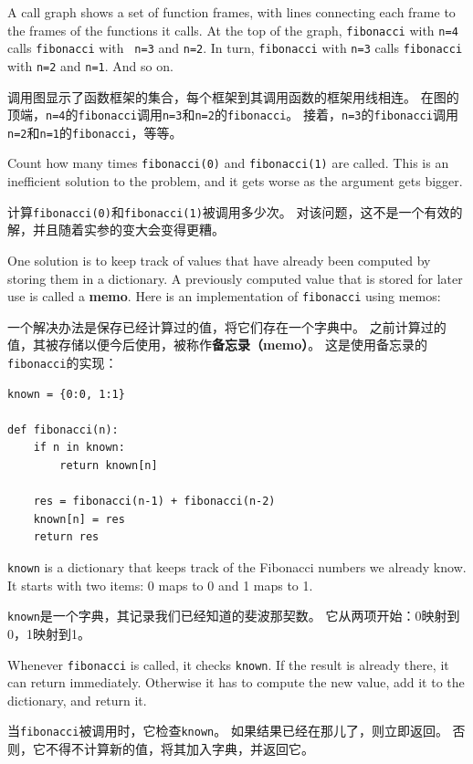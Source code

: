 \documentclass[10pt]{book}
\begin{document}
\begin{CJK}{UTF8}{gbsn}
A call graph shows a set of function frames, with lines connecting each
frame to the frames of the functions it calls.  At the top of the
graph, {\tt fibonacci} with {\tt n=4} calls {\tt fibonacci} with {\tt
n=3} and {\tt n=2}.  In turn, {\tt fibonacci} with {\tt n=3} calls
{\tt fibonacci} with {\tt n=2} and {\tt n=1}.  And so on.

调用图显示了函数框架的集合，每个框架到其调用函数的框架用线相连。
在图的顶端，{\tt n=4}的{\tt fibonacci}调用{\tt n=3}和{\tt n=2}的{\tt fibonacci}。
接着，{\tt n=3}的{\tt fibonacci}调用{\tt n=2}和{\tt n=1}的{\tt fibonacci}，等等。

Count how many times {\tt fibonacci(0)} and {\tt fibonacci(1)} are
called.  This is an inefficient solution to the problem, and it gets
worse as the argument gets bigger.

计算{\tt fibonacci(0)}和{\tt fibonacci(1)}被调用多少次。
对该问题，这不是一个有效的解，并且随着实参的变大会变得更糟。

One solution is to keep track of values that have already been
computed by storing them in a dictionary.  A previously computed value
that is stored for later use is called a {\bf memo}.  Here is an
implementation of {\tt fibonacci} using memos:

一个解决办法是保存已经计算过的值，将它们存在一个字典中。
之前计算过的值，其被存储以便今后使用，被称作{\bf 备忘录（memo）}。
这是使用备忘录的{\tt fibonacci}的实现：

\begin{verbatim}
known = {0:0, 1:1}

def fibonacci(n):
    if n in known:
        return known[n]

    res = fibonacci(n-1) + fibonacci(n-2)
    known[n] = res
    return res
\end{verbatim}
%
{\tt known} is a dictionary that keeps track of the Fibonacci
numbers we already know.  It starts with
two items: 0 maps to 0 and 1 maps to 1.

{\tt known}是一个字典，其记录我们已经知道的斐波那契数。
它从两项开始：0映射到0，1映射到1。

Whenever {\tt fibonacci} is called, it checks {\tt known}.
If the result is already there, it can return
immediately.  Otherwise it has to 
compute the new value, add it to the dictionary, and return it.

当{\tt fibonacci}被调用时，它检查{\tt known}。
如果结果已经在那儿了，则立即返回。
否则，它不得不计算新的值，将其加入字典，并返回它。


\end{CJK}
\end{document}
